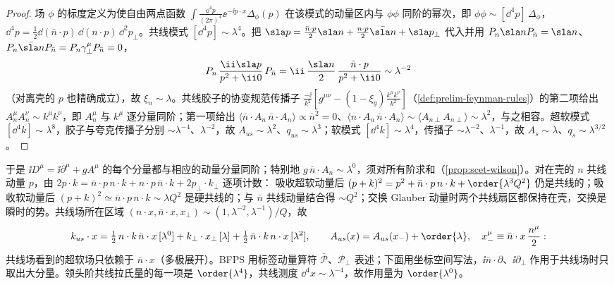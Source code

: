 \begin{proof}
场 $\phi$ 的标度定义为使自由两点函数 $\int\frac{\dd^4p}{(2\pi)^4}\ee^{-\ii p\cdot x}\Delta_\phi(p)$ 在该模式的动量区内与 $\phi\phi$ 同阶的幂次，即 $\phi\phi\sim[\dd^4p]\,\Delta_\phi$，$\dd^4p=\frac12\dd(\bar n\cdot p)\,\dd(n\cdot p)\,\dd^2p_\perp$。共线模式 $[\dd^4p]\sim\lambda^4$。把 $\sla p=\frac{\bar n\cdot p}{2}\sla n+\frac{n\cdot p}{2}\bar{\sla n}+\sla p_\perp$ 代入并用 $P_n\sla nP_{\bar n}=\sla n$、$P_n\bar{\sla n}P_{\bar n}=P_n\gamma_\perp^\mu P_{\bar n}=0$，
\begin{equation}\label{eq:scet-xiprop}
P_n\,\frac{\ii\sla p}{p^2+\ii0}\,P_{\bar n}=\ii\,\frac{\sla n}{2}\,\frac{\bar n\cdot p}{p^2+\ii0}\sim\lambda^{-2}
\end{equation}
（对离壳的 $p$ 也精确成立），故 $\xi_n\sim\lambda$。共线胶子的协变规范传播子 $\frac{-\ii}{k^2}[g^{\mu\nu}-(1-\xi_g)\frac{k^\mu k^\nu}{k^2}]$（\cref{def:prelim-feynman-rules}）的第二项给出 $A_n^\mu A_n^\nu\sim k^\mu k^\nu$，即 $A_n^\mu$ 与 $k^\mu$ 逐分量同阶；第一项给出 $\langle\bar n\cdot A_n\,\bar n\cdot A_n\rangle\propto\bar n^2=0$、$\langle n\cdot A_n\,\bar n\cdot A_n\rangle\sim\langle A_{n\perp}A_{n\perp}\rangle\sim\lambda^2$，与之相容。超软模式 $[\dd^4k]\sim\lambda^8$，胶子与夸克传播子分别 $\sim\lambda^{-4}$、$\lambda^{-2}$，故 $A_{us}\sim\lambda^2$、$q_{us}\sim\lambda^3$；软模式 $[\dd^4k]\sim\lambda^4$，传播子 $\sim\lambda^{-2}$、$\lambda^{-1}$，故 $A_s\sim\lambda$、$q_s\sim\lambda^{3/2}$。
\end{proof}

于是 $\ii D^\mu=\ii\partial^\mu+gA^\mu$ 的每个分量都与相应的动量分量同阶；特别地 $g\,\bar n\cdot A_n\sim\lambda^0$，须对所有阶求和（\cref{prop:scet-wilson}）。对在壳的 $n$ 共线动量 $p$，由 $2p\cdot k=\bar n\cdot p\,n\cdot k+n\cdot p\,\bar n\cdot k+2p_\perp\cdot k_\perp$ 逐项计数：%
吸收超软动量后 $(p+k)^2=p^2+\bar n\cdot p\,n\cdot k+\order{\lambda^3Q^2}$ 仍是共线的；吸收软动量后 $(p+k)^2\simeq\bar n\cdot p\,n\cdot k\sim\lambda Q^2$ 是硬共线的；与 $\bar n$ 共线动量结合得 $\sim Q^2$；交换 Glauber 动量时两个共线扇区都保持在壳，交换是瞬时的势。共线场所在区域 $(n\cdot x,\bar n\cdot x,x_\perp)\sim(1,\lambda^{-2},\lambda^{-1})/Q$，故
\begin{equation}\label{eq:scet-multipole}
k_{us}\cdot x=\tfrac12\,n\cdot k\,\bar n\cdot x\,[\lambda^0]+k_\perp\cdot x_\perp\,[\lambda]+\tfrac12\,\bar n\cdot k\,n\cdot x\,[\lambda^2],\qquad
A_{us}(x)=A_{us}(x_-)+\order{\lambda},\quad x_-^\mu\equiv\bar n\cdot x\,\frac{n^\mu}{2}:
\end{equation}
共线场看到的超软场只依赖于 $\bar n\cdot x$（多极展开）。BFPS 用标签动量算符 $\bar{\mathcal P}$、$\mathcal P_\perp$ 表述\cite{BauerEtAl2001,BauerStewart2001}；下面用坐标空间写法\cite{BenekeEtAl2002,Beneke:2002ni}，$\ii\bar n\cdot\partial$、$\ii\partial_\perp$ 作用于共线场时只取出大分量。领头阶共线拉氏量的每一项是 $\order{\lambda^4}$，共线测度 $\dd^4x\sim\lambda^{-4}$，故作用量为 $\order{\lambda^0}$。

